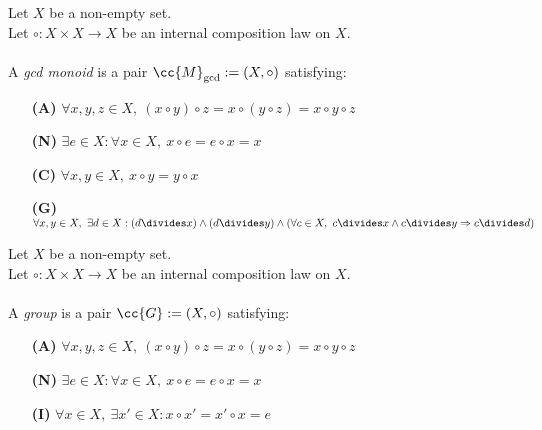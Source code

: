 \begin{definition-pre}
    \label{def:gcd_monoid}
    Let $X$ be a non-empty set.\\
    Let $\circ: X\times X \to X$ be an internal composition law on $X$. \\\\
    A \textit{gcd monoid} is a pair $\cc{M}_{\gcd}:= (X, \circ)$ satisfying:
    \begin{enumerate}
        \item [\textbf{(A)}] $\forall x,y,z\in X,\ (x\circ y)\circ z= x\circ (y\circ z) = x\circ y \circ z$
        \item [\textbf{(N)}] $\exists e \in X : \forall x \in X,\ x\circ e = e \circ x = x$
        \item [\textbf{(C)}] $\forall x,y\in X,\ x\circ y = y\circ x$
        \item [\textbf{(G)}] $\forall x,y\in X,\ \exists d \in X : (d\divides x) \land (d\divides y)
                             \land \left(\forall c \in X,\ c\divides x \land c\divides y \Rightarrow c\divides d\right)$
    \end{enumerate}
\end{definition-pre}

\begin{definition-pre}[Group]
    \label{def:group}
    Let $X$ be a non-empty set.\\
    Let $\circ: X\times X \to X$ be an internal composition law on $X$. \\\\
    A \textit{group} is a pair $\cc{G}:= (X, \circ)$ satisfying:
    \begin{enumerate}
        \item [\textbf{(A)}] $\forall x,y,z\in X,\ (x\circ y)\circ z= x\circ (y\circ z) = x\circ y \circ z$
        \item [\textbf{(N)}] $\exists e \in X : \forall x \in X,\ x\circ e = e \circ x = x$
        \item [\textbf{(I)}] $\forall x \in X,\ \exists x'\in X: x\circ x' = x'\circ x = e$
    \end{enumerate}
\end{definition-pre}

